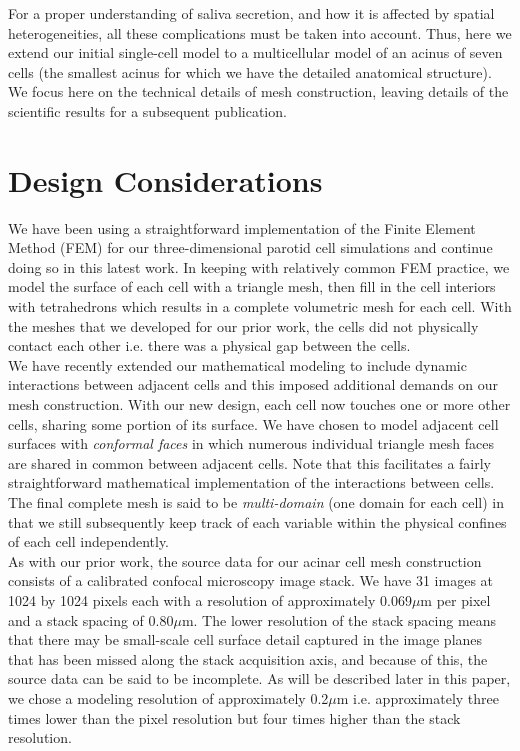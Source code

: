 \documentclass[a4paper,10pt]{article}
\begin{document}
For a proper understanding of saliva secretion, and how it is affected by spatial heterogeneities, all these complications must be taken into account. Thus, here we extend our initial single-cell model to a multicellular model of an acinus of seven cells (the smallest acinus for which we have the detailed anatomical structure).
We focus here on the technical details of mesh construction, leaving details of the scientific results for a subsequent publication.\\

\section{Design Considerations} \label{DesignConsiderations}
We have been using a straightforward implementation of the Finite Element Method (FEM) \cite{gockenbach2006understanding,Hughes2000,gosz2005finite} for our three-dimensional parotid cell simulations and continue doing so in this latest work. In keeping with relatively common FEM practice, we model the surface of each cell with a triangle mesh, then fill in the cell interiors with tetrahedrons which results in a complete volumetric mesh for each cell. With the meshes that we developed for our prior work, the cells did not physically contact each other i.e. there was a physical gap between the cells.\\

We have recently extended our mathematical modeling to include dynamic interactions between adjacent cells and this imposed additional demands on our mesh construction. With our new design, each cell now touches one or more other cells, sharing some portion of its surface. We have chosen to model adjacent cell surfaces with \emph{conformal faces} in which numerous individual triangle mesh faces are shared in common between adjacent cells. Note that this facilitates a fairly straightforward mathematical implementation of the interactions between cells. The final complete mesh is said to be \emph{multi-domain} (one domain for each cell) in that we still subsequently keep track of each variable within the physical confines of each cell independently.\\

As with our prior work, the source data for our acinar cell mesh construction consists of a calibrated confocal microscopy image stack. We have 31 images at 1024 by 1024 pixels each with a resolution of approximately 0.069$\mu$m per pixel and a stack spacing of 0.80$\mu$m. The lower resolution of the stack spacing means that there may be small-scale cell surface detail captured in the image planes that has been missed along the stack acquisition axis, and because of this, the source data can be said to be incomplete.  As will be described later in this paper, we chose a modeling resolution of approximately 0.2$\mu$m i.e. approximately three times lower than the pixel resolution but four times higher than the stack resolution.\\
\end{document}
